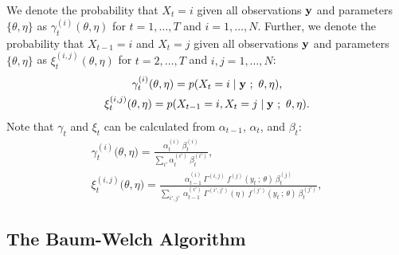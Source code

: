 We denote the probability that $X_t = i$ given all observations $\mathbf{y}$ and parameters $\{\theta,\eta\}$ as $\gamma_t^{(i)}(\theta,\eta)$ for $t = 1,\ldots,T$ and $i = 1,\ldots,N$. Further, we denote the probability that $X_{t-1} = i$ and $X_t = j$ given all observations $\mathbf{y}$ and parameters $\{\theta,\eta\}$ as $\xi_t^{(i,j)}(\theta,\eta)$ for $t = 2,\ldots,T$ and $i,j = 1,\ldots,N$:
%
\begin{gather*}
    \gamma_t^{(i)}(\theta,\eta) = p(X_t = i \mid \mathbf{y} ~;~ \theta,\eta), \\ \xi_t^{(i,j)}(\theta,\eta) = p(X_{t-1} = i, X_t = j \mid \mathbf{y} ~;~ \theta,\eta). \nonumber
\end{gather*}
%
Note that $\gamma_t$ and $\xi_t$ can be calculated from $\alpha_{t-1}$, $\alpha_t$, and $\beta_t$:
%
\begin{gather}
    \gamma_{t}^{(i)}\big(\theta,\eta\big) = \frac{\alpha_{t}^{(i)} ~ \beta_{t}^{(i)}}{\sum_{i'} \alpha_{t}^{(i')} ~ \beta_{t}^{(i')}}, \label{eqn:gamma} \\
    \xi_{t}^{(i,j)}\big(\theta, \eta) = \frac{\alpha_{t-1}^{(i)} ~ \Gamma^{(i,j)} ~ f^{(j)}(y_{t} ~ ; ~\theta) ~ \beta_{t}^{(j)}}{\sum_{i',j'} ~ \alpha_{t-1}^{(i')} ~ \Gamma^{(i',j')}(\eta) ~ f^{(j')}(y_{t} ~ ; ~\theta) ~ \beta_{t}^{(j')}} \label{eqn:xi},
\end{gather}

\subsection{The Baum-Welch Algorithm}

